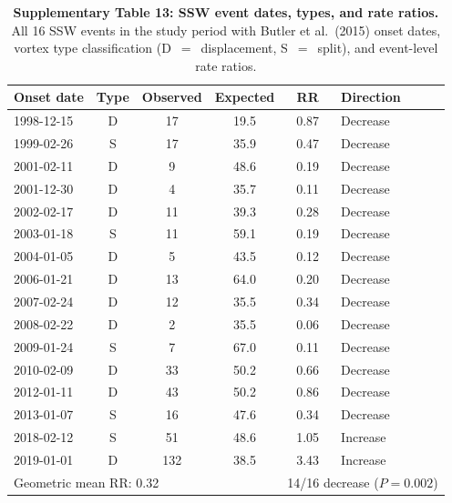 \begin{table}[!ht]
\centering
\caption{\textbf{Supplementary Table 13: SSW event dates, types, and rate ratios.}
All 16 SSW events in the study period with Butler et al.\ (2015) onset dates, vortex type classification (D~$=$~displacement, S~$=$~split), and event-level rate ratios.}
\label{tab:ssw_dates}
\small
\begin{tabular}{lccccl}
\toprule
Onset date & Type & Observed & Expected & RR & Direction \\
\midrule
1998-12-15 & D & 17 & 19.5 & 0.87 & Decrease \\
1999-02-26 & S & 17 & 35.9 & 0.47 & Decrease \\
2001-02-11 & D & 9 & 48.6 & 0.19 & Decrease \\
2001-12-30 & D & 4 & 35.7 & 0.11 & Decrease \\
2002-02-17 & D & 11 & 39.3 & 0.28 & Decrease \\
2003-01-18 & S & 11 & 59.1 & 0.19 & Decrease \\
2004-01-05 & D & 5 & 43.5 & 0.12 & Decrease \\
2006-01-21 & D & 13 & 64.0 & 0.20 & Decrease \\
2007-02-24 & D & 12 & 35.5 & 0.34 & Decrease \\
2008-02-22 & D & 2 & 35.5 & 0.06 & Decrease \\
2009-01-24 & S & 7 & 67.0 & 0.11 & Decrease \\
2010-02-09 & D & 33 & 50.2 & 0.66 & Decrease \\
2012-01-11 & D & 43 & 50.2 & 0.86 & Decrease \\
2013-01-07 & S & 16 & 47.6 & 0.34 & Decrease \\
2018-02-12 & S & 51 & 48.6 & 1.05 & Increase \\
2019-01-01 & D & 132 & 38.5 & 3.43 & Increase \\
\midrule
\multicolumn{4}{l}{Geometric mean RR: 0.32} & \multicolumn{2}{l}{14/16 decrease ($P = 0.002$)} \\
\bottomrule
\end{tabular}
\end{table}

